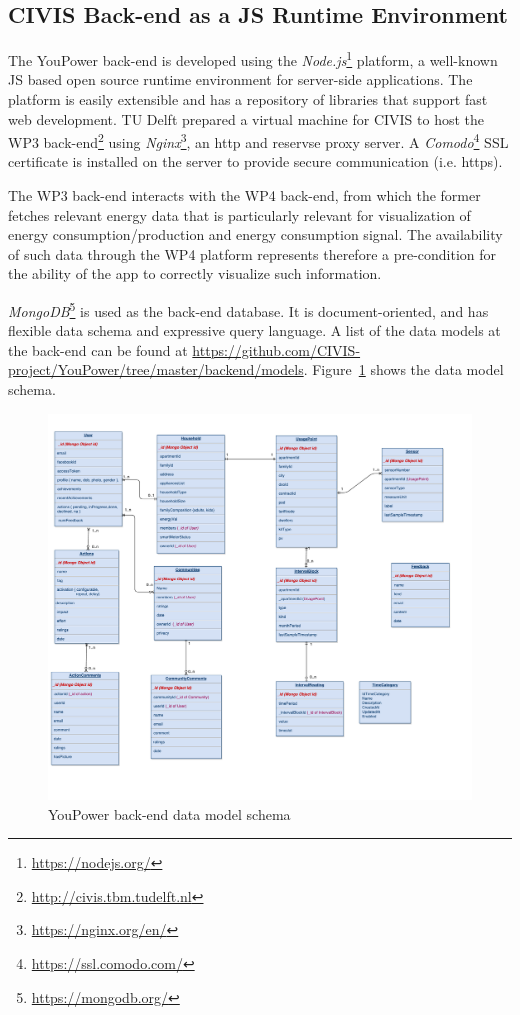 
\subsection{CIVIS Back-end as a JS Runtime Environment}

The YouPower back-end is developed using the \textit{Node.js}\footnote{\url{https://nodejs.org/}} platform, a well-known JS based open source runtime environment for server-side applications. 
The platform is easily extensible and has a repository of libraries that support fast web development. 
% 
TU Delft prepared a virtual machine for CIVIS to host the WP3 back-end\footnote{\url{http://civis.tbm.tudelft.nl}}
using \textit{Nginx}\footnote{\url{https://nginx.org/en/}}, an http and reservse proxy server. 
% 
A \textit{Comodo}\footnote{\url{https://ssl.comodo.com/}} SSL certificate is installed on the server to provide secure communication (i.e. https). 

% 
The WP3 back-end interacts with the WP4 back-end, from which the former fetches relevant energy data that is particularly relevant for visualization of energy consumption/production and energy consumption signal. The availability of such data through the WP4 platform represents therefore a pre-condition for the ability of the app to correctly visualize such information.

\textit{MongoDB}\footnote{\url{https://mongodb.org/}} is used as the back-end database. It is document-oriented, and has flexible data schema and expressive query language. 
A list of the data models at the back-end can be found at {\footnotesize\url{https://github.com/CIVIS-project/YouPower/tree/master/backend/models}}. 
Figure~\ref{fig:datamodel} shows the data model schema.
%
\begin{figure}
\centering
\includegraphics[height=\linewidth,angle=90]{img/datamodel_larger}
\caption{YouPower back-end data model schema}
\label{fig:datamodel}
\end{figure} 
% 

